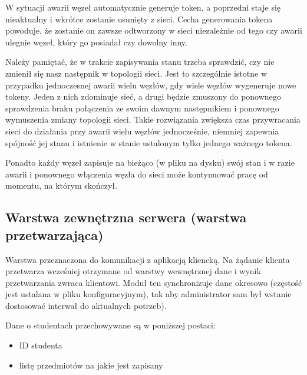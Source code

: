 {\par{W sytuacji awarii węzeł automatycznie generuje token, a poprzedni staje się nieaktualny i wkrótce zostanie usunięty z sieci. Cecha generowania tokena powoduje, że zostanie on zawsze odtworzony w sieci niezależnie od tego czy awarii ulegnie węzeł, który go posiadał czy dowolny inny.}

\par{Należy pamiętać, że w trakcie zapisywania stanu trzeba sprawdzić, czy nie zmienił się nasz następnik w topologii sieci. Jest to szczególnie istotne w przypadku jednoczesnej awarii wielu węzłów, gdy wiele węzłów wygeneruje nowe tokeny. Jeden z nich zdominuje sieć, a drugi będzie zmuszony do ponownego sprawdzenia braku połączenia ze swoim dawnym następnikiem i ponownego wymuszenia zmiany topologii sieci. Takie rozwiązania zwiększa czas przywracania sieci do działania przy awarii wielu węzłów jednocześnie, niemniej zapewnia spójność jej stanu i istnienie w stanie ustalonym tylko jednego ważnego tokena.}

\par{Ponadto każdy węzeł zapisuje na bieżąco (w pliku na dysku) swój stan i w razie awarii i ponownego włączenia węzła do sieci może kontynuować pracę od momentu, na którym skończył.}

\subsection[Warstwa zewnętrzna serwera]{Warstwa zewnętrzna serwera (warstwa przetwarzająca)}

\par{Warstwa przeznaczona do komunikacji z aplikacją kliencką. Na żądanie klienta przetwarza wcześniej otrzymane od warstwy wewnętrznej dane i wynik przetwarzania zwraca klientowi. Moduł ten synchronizuje dane okresowo (częstość jest ustalana w pliku konfiguracyjnym), tak aby administrator sam był wstanie dostosować interwał do aktualnych potrzeb).}

\par{Dane o studentach przechowywane są w poniższej postaci:}

\begin{itemize}
\item ID studenta
\item listę przedmiotów na jakie jest zapisany
\end{itemize}

}
